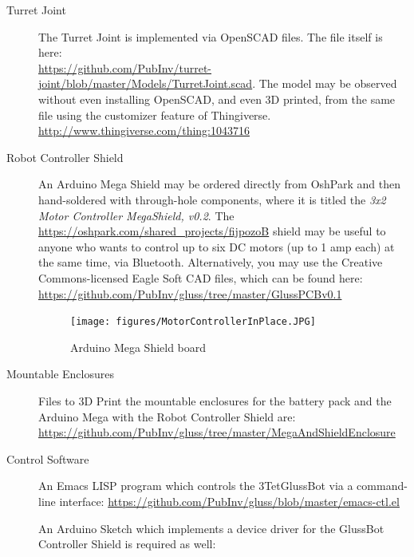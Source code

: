 \documentclass[11pt]{article}
\begin{document}
\begin{description}
  
\item [Turret Joint]
  The Turret Joint is implemented via OpenSCAD files. The file itself is here:\\
  \href{https://github.com/PubInv/turret-joint/blob/master/Models/TurretJoint.scad}
       {https://github.com/PubInv/turret-joint/blob/master/Models/TurretJoint.scad}.
       The model may be observed without even installing OpenSCAD, and even 3D printed,
       from the same file using the customizer feature of Thingiverse.\\
       \href{http://www.thingiverse.com/thing:1043716}{http://www.thingiverse.com/thing:1043716}
  
\item [Robot Controller Shield]
  An Arduino Mega Shield may be ordered directly from OshPark and then hand-soldered with through-hole components,
  where it is titled the \emph{3x2 Motor Controller MegaShield, v0.2}.
  The \href{https://oshpark.com/shared_projects/fijpozoB}{https://oshpark.com/shared\_projects/fijpozoB} shield
  may be useful to anyone who wants to control up to six DC motors (up to 1 amp each) at the same time, via Bluetooth.
  Alternatively, you may use the Creative Commons-licensed Eagle Soft CAD files, which can be found here:\\
  \href{https://github.com/PubInv/gluss/tree/master/GlussPCBv0.1}
  {https://github.com/PubInv/gluss/tree/master/GlussPCBv0.1}
   \begin{figure}[H]
     \centering
     \texttt{[image: figures/MotorControllerInPlace.JPG]}
     \caption{Arduino Mega Shield board}
   \end{figure}

\item [Mountable Enclosures]
  Files to 3D Print the mountable enclosures for the battery pack and the Arduino Mega with the Robot Controller Shield are:\\
  \href{https://github.com/PubInv/gluss/tree/master/MegaAndShieldEnclosure}{https://github.com/PubInv/gluss/tree/master/MegaAndShieldEnclosure}

\item [Control Software]
An Emacs LISP program which controls the 3TetGlussBot via a command-line interface:
\href{https://github.com/PubInv/gluss/blob/master/emacs-ctl.el}{https://github.com/PubInv/gluss/blob/master/emacs-ctl.el}

An Arduino Sketch which implements a device driver for the GlussBot Controller Shield is required as well:


\end{description}
\end{document}
